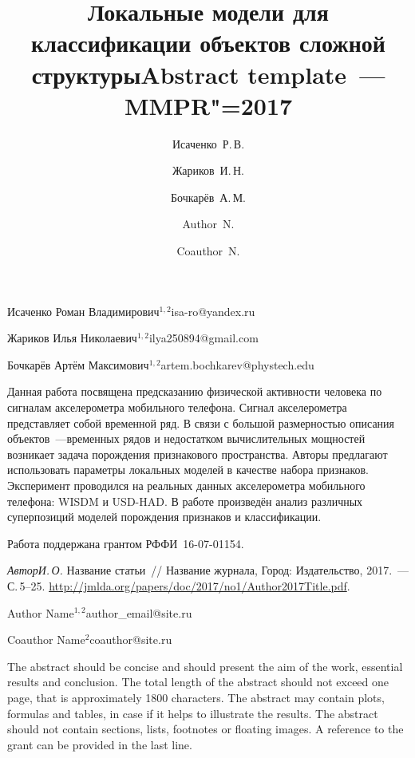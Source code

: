 \documentclass[twoside]{article}
\begin{document}
\Russian
\title{Локальные модели для классификации объектов сложной структуры}
\author{Исаченко~Р.\,В.}{Исаченко Роман Владимирович$^{1, 2}$}{isa-ro@yandex.ru}
\author{Жариков~И.\,Н.}{Жариков Илья Николаевич$^{1, 2}$}{ilya250894@gmail.com}
\author{Бочкарёв~А.\,М.}{Бочкарёв Артём Максимович$^{1, 2}$\speaker}{artem.bochkarev@phystech.edu}
\maketitle
	Данная работа посвящена предсказанию физической активности человека по сигналам акселерометра мобильного телефона. 
Сигнал акселерометра представляет собой временной ряд. 
В связи с большой размерностью описания объектов~---временных рядов и недостатком вычислительных мощностей возникает задача порождения признакового пространства. 
Авторы предлагают использовать параметры локальных моделей в качестве набора признаков. 
Эксперимент проводился на реальных данных акселерометра мобильного телефона: WISDM и USD-HAD.
В работе произведён анализ различных суперпозиций моделей порождения признаков и классификации.

Работа поддержана грантом РФФИ \No\,16-07-01154.

\begin{thebibliography}{1}
    \emph{Автор\;И.\,О.}
    Название статьи~//
    Название журнала,
    Город: Издательство, 2017.~--- С.\,5--25. %
    \url{http://jmlda.org/papers/doc/2017/no1/Author2017Title.pdf}.
\end{thebibliography}

\English
\title{Abstract template~--- MMPR"=2017}
\author{Author~N.}{Author Name$^{1, 2}$}{author\_email@site.ru}
\author{Coauthor~N.}{Coauthor Name$^2$\speaker}{coauthor@site.ru}
\maketitle

The abstract should be concise and should present the aim of the work, essential results and conclusion.
The total length of the abstract should not exceed one page, that is approximately 1800 characters.
The abstract may contain plots, formulas and tables, in case if it helps to illustrate the results.
The abstract should not contain sections, lists, footnotes or floating images.
A reference to the grant can be provided in the last line.
\end{document}
